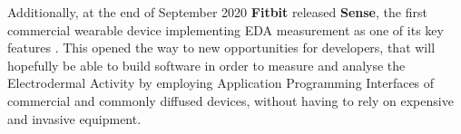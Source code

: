 Additionally, at the end of September 2020 \textbf{Fitbit} released \textbf{Sense}, the first commercial wearable device implementing EDA measurement as one of its key features \cite{fitbit-eda}. This opened the way to new opportunities for developers, that will hopefully be able to build software in order to measure and analyse the Electrodermal Activity by employing Application Programming Interfaces of commercial and commonly diffused devices, without having to rely on expensive and invasive equipment.




